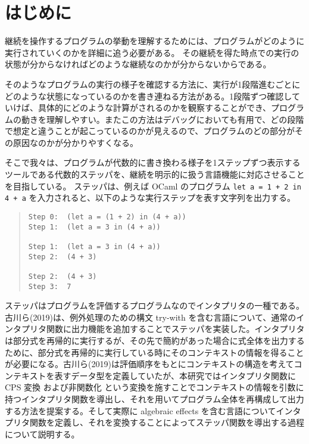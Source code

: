 \section{はじめに}

継続を操作するプログラムの挙動を理解するためには、プログラムがどのように実行されていくのかを詳細に追う必要がある。
その継続を得た時点での実行の状態が分からなければどのような継続なのかが分からないからである。

そのようなプログラムの実行の様子を確認する方法に、実行が1段階進むごとにどのような状態になっているのかを書き連ねる方法がある。1段階ずつ確認していけば、具体的にどのような計算がされるのかを観察することができ、プログラムの動きを理解しやすい。またこの方法はデバッグにおいても有用で、どの段階で想定と違うことが起こっているのかが見えるので、プログラムのどの部分がその原因なのかが分かりやすくなる。

そこで我々は、プログラムが代数的に書き換わる様子を1ステップずつ表示するツールである代数的ステッパを、継続を明示的に扱う言語機能に対応させることを目指している。
ステッパは、例えば OCaml のプログラム \texttt{let a = 1 + 2 in 4 + a} を入力されると、以下のような実行ステップを表す文字列を出力する。

\begin{quote}
\begin{verbatim}
Step 0:  (let a = (1 + 2) in (4 + a))
Step 1:  (let a = 3 in (4 + a))

Step 1:  (let a = 3 in (4 + a))
Step 2:  (4 + 3)

Step 2:  (4 + 3)
Step 3:  7
\end{verbatim}
\end{quote}

ステッパはプログラムを評価するプログラムなのでインタプリタの一種である。古川ら(2019)\cite{FCA19}は、例外処理のための構文 try-with を含む言語について、通常のインタプリタ関数に出力機能を追加することでステッパを実装した。インタプリタは部分式を再帰的に実行するが、その先で簡約があった場合に式全体を出力するために、部分式を再帰的に実行している時にそのコンテキストの情報を得ることが必要になる。古川ら(2019)\cite{FCA19}は評価順序をもとにコンテキストの構造を考えてコンテキストを表すデータ型を定義していたが、本研究ではインタプリタ関数に CPS 変換 \cite{PLOTKIN1975125} および非関数化 \cite{Reynolds1998} という変換を施すことでコンテキストの情報を引数に持つインタプリタ関数を導出し、それを用いてプログラム全体を再構成して出力する方法を提案する。そして実際に algebraic effects を含む言語についてインタプリタ関数を定義し、それを変換することによってステッパ関数を導出する過程について説明する。
